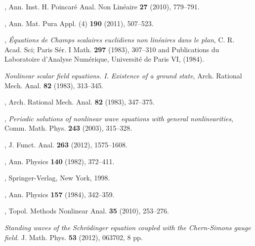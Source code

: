 \documentclass[11pt,leqno,twoside,reqno]{amsart}
\numberwithin{equation}{section}
\begin{document}
\begin{thebibliography}{99}

, 
Ann. Inst. H. Poincar\'e Anal. Non Lin\'eaire {\bf 27} (2010), 779--791.

, 
Ann. Mat. Pura Appl. (4) {\bf 190} (2011), 507--523.

, {\sl \'Equations de Champs scalaires euclidiens non lin\'eaires dans le plan}, 
C. R. Acad. Sci; Paris S\'er. I Math. {\bf 297}  (1983), 307--310 and Publications du Laboratoire d'Analyse Num\'erique, Universit\'e de Paris VI, 
(1984).

 {\sl Nonlinear scalar field equations. I. Existence of a ground state},
Arch. Rational Mech. Anal. {\bf 82}  (1983), 313--345.

,
Arch. Rational Mech. Anal. {\bf 82} (1983), 347--375.

, {\sl Periodic solutions of nonlinear wave equations with general nonlinearities}, Comm. Math. Phys. {\bf 243} (2003), 315--328.

, 
J. Funct. Anal.  {\bf 263} (2012), 1575--1608.

, 
Ann. Physics {\bf 140} (1982), 372--411.

, Springer-Verlag, New York, 1998.

, 
Ann. Physics  {\bf 157} (1984), 342--359.

,
Topol. Methods Nonlinear Anal. {\bf 35} (2010), 253--276.

{\sl Standing waves of the Schr\"{o}dinger equation coupled with the Chern-Simons gauge field. }
{J. Math. Phys.  {\bf 53}  (2012), 063702, 8 pp.}


\end{thebibliography}
\end{document}
